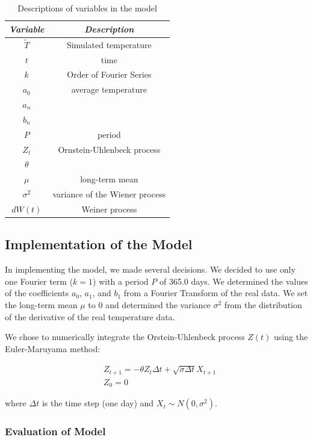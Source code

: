 \documentclass[11pt, letterpaper]{article}
\begin{document}
\begin{table}[H]
  \centering
  \begin{tabular}{c c} \hline
  \emph{Variable} & \emph{Description}\\ \hline
  $\tilde{T}$ & Simulated temperature \\ \hline
  $t$ & time \\ \hline
  $k$ & Order of Fourier Series \\ \hline
  $a_0$ & average temperature \\ \hline
  $a_n$ & \\ \hline
  $b_n$ &  \\ \hline
  $P$ & period  \\ \hline
  $Z_t$ & Ornstein-Uhlenbeck process \\ \hline
  $\theta$ & \\ \hline
  $\mu$ & long-term mean \\ \hline
  $\sigma^2$ & variance of the Wiener process \\ \hline
  $dW(t)$ & Weiner process \\ \hline 
  \end{tabular}
  \caption{Descriptions of variables in the model}
  \label{tab:analysis-ft-values}
\end{table}


\subsection{Implementation of the Model}
In implementing the model, we made several decisions.  We decided to use only one Fourier term ($k=1$) with a period $P$ of 365.0 days.  We determined the values of the coefficients $a_0$, $a_1$, and $b_1$ from a Fourier Transform of the real data.  We set the long-term mean $\mu$ to 0 and determined the variance $\sigma^2$ from the distribution of the derivative of the real temperature data.

We chose to numerically integrate the Orstein-Uhlenbeck process $Z(t)$ using the Euler-Maruyama method:

\begin{align}
&Z_{t+1} = - \theta Z_t \Delta t + \sqrt{\sigma \Delta t} X_{t+1} \\
&Z_0 = 0
\end{align}

where $\Delta t$ is the time step (one day) and $X_t \sim N(0, \sigma^2)$.

\subsubsection{Evaluation of Model}
\end{document}
